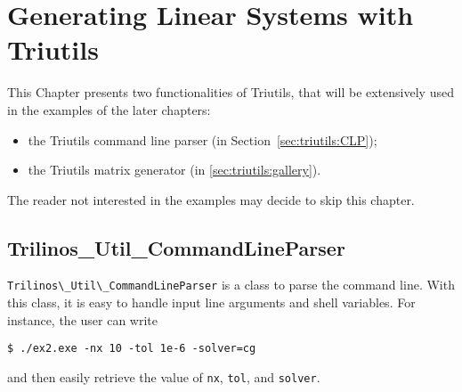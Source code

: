 % 
% 
% 
%  
%  
% 

\section{Generating Linear Systems with Triutils}
\label{chap:triutils}

This Chapter presents two functionalities of Triutils, that will be
extensively used in the examples of the later chapters: 
\begin{itemize}
\item the Triutils command line parser (in
  Section~\ref{sec:triutils:CLP});
\item the Triutils matrix generator (in \ref{sec:triutils:gallery}).
\end{itemize}
The reader not interested in the examples may decide to skip this chapter.


\subsection{Trilinos\_Util\_CommandLineParser}
\label{sec:triutils:shell}

\verb!Trilinos\_Util\_CommandLineParser! is a class to parse the command
line.  With this class, it is easy to handle
input line arguments and shell variables. For instance, the user can
write
\begin{verbatim}
$ ./ex2.exe -nx 10 -tol 1e-6 -solver=cg 
\end{verbatim}
and then easily retrieve the value of {\tt nx}, {\tt tol}, and {\tt solver}.
 
